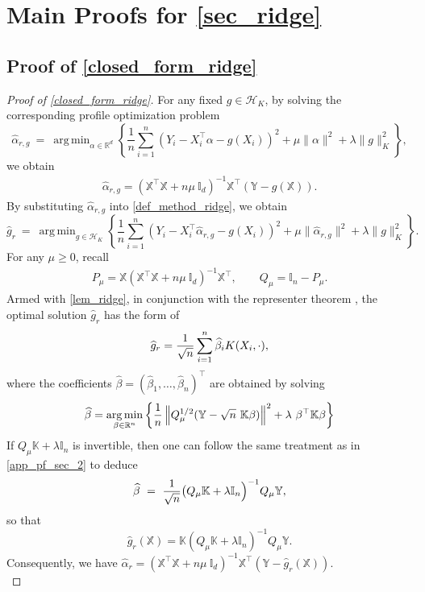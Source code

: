 \documentclass[11pt,twoside]{article}
\DeclareMathOperator*{\argmin}{arg\,min}
\def\KK{\mathbb{K}}
\def\II{\mathbb{I}}
\def\YY{\mathbb{Y}}
\def\XX{\mathbb{X}}
\def\RR{\mathbb{R}}
\def\cH{\mathcal H}
\def\wh{\widehat}
\def\T{\top}
\def\l{\left}
\def\r{\right}
\def\B{\Big}
\begin{document}
\section{Main Proofs for \texorpdfstring{\cref{sec_ridge}}{\texttwoinferior}} \label{app_pf_ridge}

\subsection{Proof of \texorpdfstring{\cref{closed_form_ridge}}{\texttwoinferior}}\label{app_pf_closed_form_ridge}

\begin{proof}[Proof of \eqref{closed_form_ridge}]
For any fixed $g \in \cH_K$, by solving the corresponding profile optimization problem
\[
\wh \alpha_{r,g}
~ =~  \argmin_{\alpha\in \RR^d}  \l\{ \frac{1}{n} \sum_{i=1}^n\l(Y_i -   X_i ^\T  \alpha - g(X_i)\r)^2 +  \mu \|\alpha\|^2
+\lambda\|g\|_{K}^2  \r\},
\]
we obtain 
\begin{align}\label{def_alpha_r_g}
    \wh \alpha_{r,g} = ( \XX ^\T \XX+ n \mu  ~ \II_d) ^{-1}  \XX^\T  (\YY - g(\XX)).
\end{align}
By substituting $\wh \alpha_{r,g}$ into 
\eqref{def_method_ridge}, we obtain
\[
\wh g_r
~ =~ \argmin_{ g \in \cH_K}  \left\{ \frac{1}{n} \sum_{i=1}^n\l(Y_i- X_i ^\T  \wh \alpha_{r,g}   - g(X_i)\r)^2 + \mu \|\wh \alpha_{r,g} \|^2  +\lambda \|g\|_K^2 \right\}.
\]
For any $\mu\ge 0$, recall 
\begin{align} \label{def_P_mu}
    P_{\mu}  = \XX ( \XX ^\T \XX+ n \mu  ~ \II_d) ^{-1}  \XX^\T,\qquad   Q_\mu =\II_n- P_\mu. 
\end{align}
Armed with \cref{lem_ridge},
in conjunction with the representer theorem \citep{kimeldorf1971some},  the optimal solution $\wh g_r$  has the form of 
\[
\wh g _r ={ 1\over \sqrt{n}} \sum_{i=1}^n \wh \beta_i K(X_i,\cdot),
\]
where the coefficients $\wh \beta = (\wh \beta_1,\ldots, \wh \beta_n)^\T$ are obtained by  solving 
\[
\wh \beta =   \argmin_{\beta \in \RR^n}  \left \{
    {1\over n}\left\| Q_\mu^{1/2} (\YY - \sqrt{n} ~ \KK \beta ) \right\|^2
    +\lambda  ~ \beta^\T \KK \beta \right \}
\]
If $Q_\mu \KK+\lambda \II_n $ is invertible, then one can follow the same treatment as in \cref{app_pf_sec_2} to deduce
\[
  \wh \beta ~  =~ {1\over \sqrt n}\bigl(Q_\mu   \KK+\lambda \II_n\B)^{-1} Q_\mu  \YY,
\]
so that
\[
 \wh g_r(\XX) = \KK( Q_\mu \KK +\lambda \II_n )^{-1} Q_\mu \YY.
\]
Consequently, we have 
$
    \wh \alpha_r = ( \XX ^\T \XX+ n \mu  ~ \II_d) ^{-1}  \XX^\T (\YY -  \wh g_r(\XX)) .
$\\




\end{proof}
\end{document}

